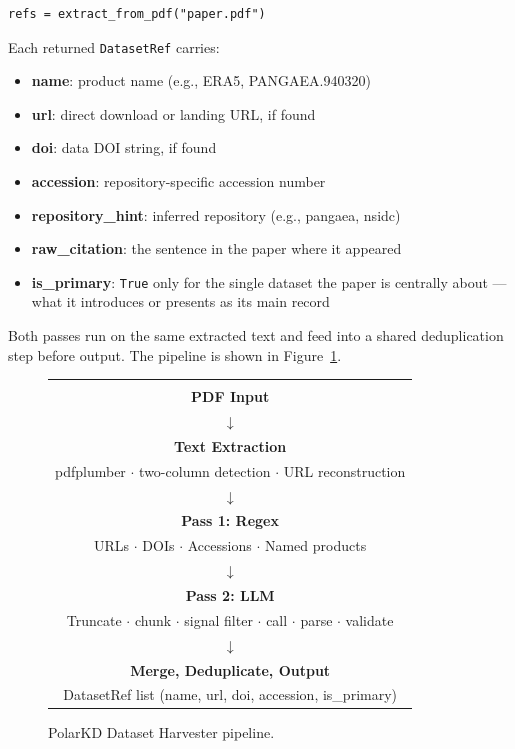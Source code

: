 \documentclass[sigconf]{acmart}
\begin{document}
\begin{verbatim}
refs = extract_from_pdf("paper.pdf")
\end{verbatim}

\noindent Each returned \texttt{DatasetRef} carries:

\begin{itemize}[noitemsep, topsep=2pt]
  \item \textbf{name}: product name (e.g., ERA5, PANGAEA.940320)
  \item \textbf{url}: direct download or landing URL, if found
  \item \textbf{doi}: data DOI string, if found
  \item \textbf{accession}: repository-specific accession number
  \item \textbf{repository\_hint}: inferred repository (e.g., pangaea, nsidc)
  \item \textbf{raw\_citation}: the sentence in the paper where it appeared
  \item \textbf{is\_primary}: \texttt{True} only for the single dataset the paper
    is centrally about — what it introduces or presents as its main record
\end{itemize}

Both passes run on the same extracted text and feed into a shared deduplication
step before output. The pipeline is shown in Figure~\ref{fig:pipeline}.

\begin{figure}[t]
\centering
\small
\renewcommand{\arraystretch}{1.2}
\begin{tabular}{|c|}
\hline
\\[-1.5ex]
\textbf{PDF Input} \\[3pt]
$\downarrow$ \\[2pt]
\textbf{Text Extraction} \\
{\footnotesize pdfplumber $\cdot$ two-column detection $\cdot$ URL reconstruction} \\[3pt]
$\downarrow$ \\[2pt]
\textbf{Pass 1: Regex} \\
{\footnotesize URLs $\cdot$ DOIs $\cdot$ Accessions $\cdot$ Named products} \\[3pt]
$\downarrow$ \\[2pt]
\textbf{Pass 2: LLM} \\
{\footnotesize Truncate $\cdot$ chunk $\cdot$ signal filter $\cdot$ call $\cdot$ parse $\cdot$ validate} \\[3pt]
$\downarrow$ \\[2pt]
\textbf{Merge, Deduplicate, Output} \\
{\footnotesize DatasetRef list (name, url, doi, accession, is\_primary)} \\[2pt]
\hline
\end{tabular}
\caption{PolarKD Dataset Harvester pipeline.}
\label{fig:pipeline}
\end{figure}
\end{document}
